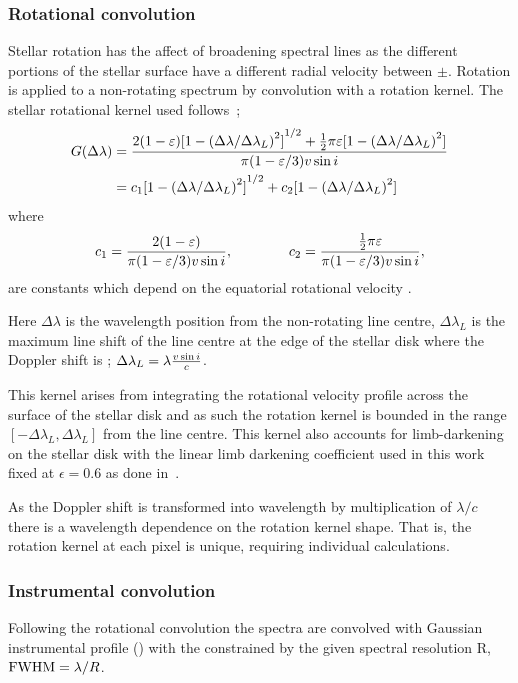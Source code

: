 \subsubsection*{Rotational convolution}
\label{subsubsec:rotational_convolution}
Stellar rotation has the affect of broadening spectral lines as the different portions of the stellar surface have a different radial velocity between \(\pm\)\Vsini{}.
Rotation is applied to a non-rotating spectrum by convolution with a rotation kernel.
The stellar rotational kernel used follows~\citet{gray_observation_2005};
\begin{align}
G(\Delta\lambda) &= \frac{2(1-\varepsilon){[1-{(\Delta\lambda /{\Delta\lambda}_{L})}^{2}]}^{1/2} +   \frac{1}{2}\pi\varepsilon[1-{(\Delta\lambda /{\Delta\lambda}_{L})}^{2}]}{\pi (1-\varepsilon/3) v\sin{i}}\\
&= c_{1}{[1- {(\Delta\lambda /\Delta\lambda_{L})}^{2}]}^{1/2} + c_{2}[1-{(\Delta\lambda /\Delta\lambda_{L})}^{2}] \label{eqn:rotational_profile}
\end{align}
where
\begin{equation}
{c}_{1} = \frac{2(1-\varepsilon)} {\pi (1-\varepsilon/3)v\sin{i}}, \hspace{4em} {c}_{2} = \frac{\frac{1}{2}\pi\varepsilon} {\pi (1-\varepsilon/3)v\sin{i}},
\end{equation}
are constants which depend on the equatorial rotational velocity \Vsini{}.

Here $\Delta\lambda$ is the wavelength position from the non-rotating line centre, $\Delta\lambda_{L}$ is the maximum line shift of the line centre at the edge of the stellar disk where the Doppler shift is \Vsini{}; $\Delta\lambda_{L} = \lambda \frac{v\sin{i}}{c}$.

This kernel arises from integrating the rotational velocity profile across the surface of the stellar disk and as such the rotation kernel is bounded in the range $[-\Delta\lambda_L, \Delta\lambda_{L}]$ from the line centre.
This kernel also accounts for limb-darkening on the stellar disk with the linear limb darkening coefficient used in this work fixed at $\epsilon=0.6$ as done in~\citet{figueira_radial_2016}.

As the Doppler shift \Vsini{} is transformed into wavelength by multiplication of $\lambda / c$ there is a wavelength dependence on the rotation kernel shape.
That is, the rotation kernel at each pixel is unique, requiring individual calculations.

\subsubsection*{Instrumental convolution}
\label{subsubsec:instrumental_convolution}
Following the rotational convolution the spectra are convolved with Gaussian instrumental profile ({\IP{}}) with the {\fwhm}  constrained by the given spectral resolution R, $\textrm{FWHM}=\lambda/R$.

